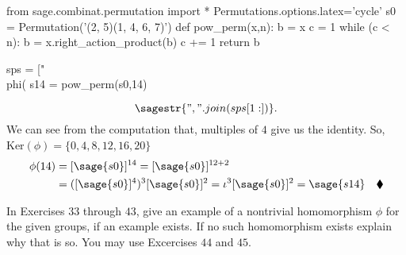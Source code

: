 \documentclass{article}
\begin{document}
\begin{sagesilent}
  from sage.combinat.permutation import *
  Permutations.options.latex='cycle'
  s0 = Permutation('(2, 5)(1, 4, 6, 7)')
  def pow_perm(x,n):
      b = x
      c = 1
      while (c < n):
          b = x.right_action_product(b)
          c += 1
      return b

  sps = ["\\phi(%
  s14 = pow_perm(s0,14)
\end{sagesilent}

$$\sagestr{", ".join(sps[1:])}.$$
We can see from the computation that, multiples of $4$ give us the
identity.
So, Ker$(\phi) = \{0,4,8,12,16,20\}$
\begin{align*}
\phi(14) &= [\sage{s0}]^{14} = [\sage{s0}]^{12+2}\\
 &=([\sage{s0}]^4)^3 [\sage{s0}]^2 =
   \iota^3[\sage{s0}]^2 = \sage{s14}\quad \blacklozenge
\end{align*}


In Exercises $33$ through $43$, give an example of a nontrivial
homomorphism $\phi$ for the given groups, if an example exists. If no
such homomorphism exists explain why that is so. You may use
Excercises $44$ and $45$.
\end{document}
